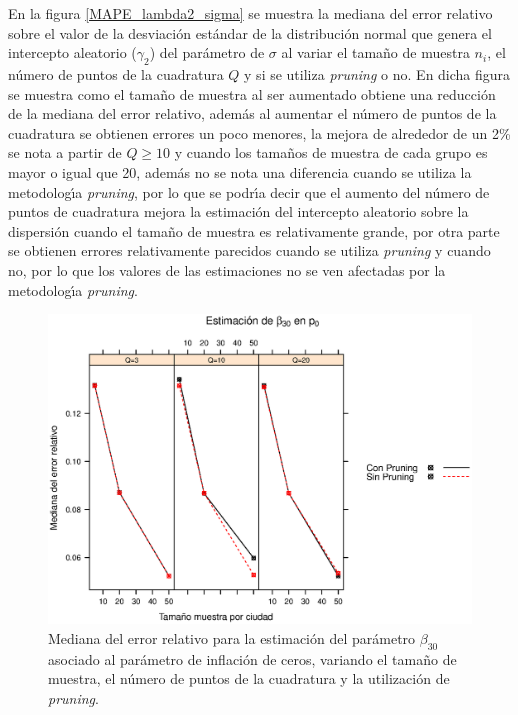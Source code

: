 En la figura \ref{MAPE_lambda2_sigma} se muestra la mediana del error relativo sobre el valor de la desviaci\'{o}n est\'{a}ndar de la distribuci\'{o}n normal que genera el intercepto aleatorio ($\gamma_2$) del par\'{a}metro de $\sigma$ al variar el tama\~{n}o de muestra $n_i$, el n\'{u}mero de puntos de la cuadratura $Q$ y si se utiliza \textit{pruning} o no. En dicha figura se muestra como el tama\~{n}o de muestra al ser aumentado obtiene una reducci\'{o}n de la mediana del error relativo, adem\'{a}s al aumentar el n\'{u}mero de puntos de la cuadratura se obtienen errores un poco menores, la mejora de alrededor de un 2\% se nota a partir de $Q\geq10$ y cuando los tama\~{n}os de muestra de cada grupo es mayor o igual que 20, adem\'{a}s no se nota una diferencia cuando se utiliza la metodolog\'{\i}a \textit{pruning}, por lo que se podr\'{\i}a decir que el aumento del n\'{u}mero de puntos de cuadratura mejora la estimaci\'{o}n del intercepto aleatorio sobre la dispersi\'{o}n cuando el tama\~{n}o de muestra es relativamente grande, por otra parte se obtienen errores relativamente parecidos cuando se utiliza \textit{pruning} y cuando no, por lo que los valores de las estimaciones no se ven afectadas por la metodolog\'{\i}a \textit{pruning}.\\


\begin{figure}
	\begin{center}
		\includegraphics[scale=0.6]{MAPE_beta0_p0.eps}	
		\caption{Mediana del error relativo para la estimaci\'{o}n del par\'{a}metro $\beta_{30}$ asociado al par\'{a}metro de inflaci\'{o}n de ceros, variando el tama\~{n}o de muestra, el n\'{u}mero de puntos de la cuadratura y la utilizaci\'{o}n de \textit{pruning}.}
		\label{MAPE_beta0_p0}
	\end{center}
\end{figure}


